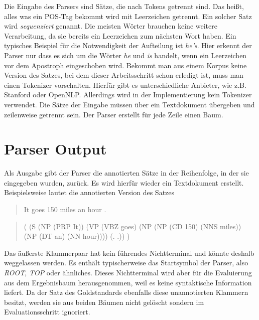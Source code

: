 Die Eingabe des Parsers sind Sätze, die nach Tokens getrennt sind. Das heißt, alles was ein POS-Tag bekommt wird mit Leerzeichen getrennt. Ein solcher Satz wird \textit{sequenziert} genannt. Die meisten Wörter brauchen keine weitere Verarbeitung, da sie bereits ein Leerzeichen zum nächsten Wort haben. Ein typisches Beispiel für die Notwendigkeit der Aufteilung ist \textit{he's}. Hier erkennt der Parser nur dass es sich um die Wörter \textit{he} und \textit{is} handelt, wenn ein Leerzeichen vor dem Apostroph eingeschoben wird. Bekommt man aus einem Korpus keine Version des Satzes, bei dem dieser Arbeitsschritt schon erledigt ist, muss man einen Tokenizer vorschalten. Hierfür gibt es unterschiedliche Anbieter, wie z.B. Stanford oder OpenNLP. %
Allerdings wird in der Implementierung kein Tokenizer verwendet. Die Sätze der Eingabe müssen über ein Textdokument übergeben und zeilenweise getrennt sein. Der Parser erstellt für jede Zeile einen Baum.

\section{Parser Output}
Als Ausgabe gibt der Parser die annotierten Sätze in der Reihenfolge, in der sie eingegeben wurden, zurück. Es wird hierfür wieder ein Textdokument erstellt. %
Beispielsweise lautet die annotierten Version des Satzes
\begin{quote}
It goes 150 miles an hour .
\end{quote}
\begin{quote}
( (S (NP (PRP It)) (VP (VBZ goes) (NP (NP (CD 150) (NNS miles)) \\(NP (DT an) (NN hour)))) (. .)) )
\end{quote}
Das äußerste Klammerpaar hat kein führendes Nichtterminal und könnte deshalb weggelassen werden. Es enthält typischerweise das Startsymbol der Parser, also \textit{ROOT}, \textit{TOP} oder ähnliches. Dieses Nichtterminal wird aber für die Evaluierung aus dem Ergebnisbaum herausgenommen, weil es keine syntaktische Information liefert. Da der Satz des Goldstandards ebenfalls diese unannotierten Klammern besitzt, werden sie aus beiden Bäumen nicht gelöscht sondern im Evaluationsschritt ignoriert.

